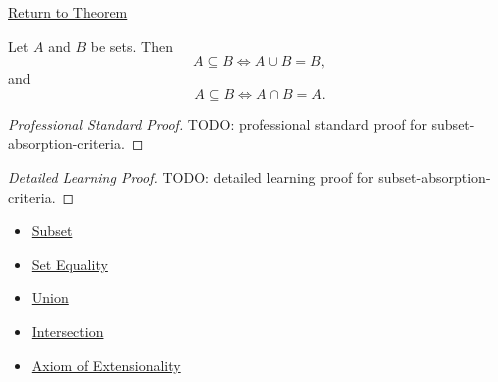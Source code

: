 \newpage
{}
\label{prf:subset-absorption-criteria}

\begin{remark*}[Return]
\hyperref[thm:subset-absorption-criteria]{Return to Theorem}
\end{remark*}

\begin{theorem*}
Let $A$ and $B$ be sets. Then
\[
A\subseteq B \iff A\cup B=B,
\]
and
\[
A\subseteq B \iff A\cap B=A.
\]
\end{theorem*}

\begin{proof}[Professional Standard Proof]
\LRAProofBodyStart
TODO: professional standard proof for subset-absorption-criteria.
\end{proof}

\begin{proof}[Detailed Learning Proof]
\LRAProofBodyStart
TODO: detailed learning proof for subset-absorption-criteria.
\end{proof}

\begin{remark*}
\end{remark*}

\begin{dependencies}
\begin{itemize}
  \item \hyperref[def:subset]{Subset}
  \item \hyperref[def:set-equality]{Set Equality}
  \item \hyperref[def:union]{Union}
  \item \hyperref[def:intersection]{Intersection}
  \item \hyperref[ax:extensionality]{Axiom of Extensionality}
\end{itemize}
\end{dependencies}

\clearpage
